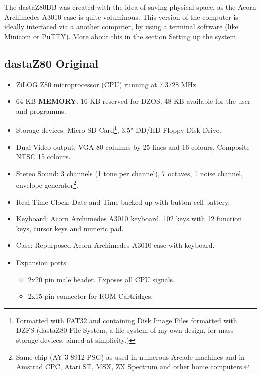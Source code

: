\documentclass[a4paper,11pt]{article}
\begin{document}
    The dastaZ80DB was created with the idea of saving physical space, as the
    Acorn Archimedes A3010 case is quite voluminous. This version of the
    computer is ideally interfaced via a another computer, by using a terminal
    software (like Minicom or PuTTY). More about this in the section
    \hyperref[sec:setting_system]{Setting up the system}.

    \subsection{dastaZ80 Original}

    \begin{itemize}
        \item ZiLOG Z80 microprocessor (CPU) running at 7.3728 MHz
        \item 64 KB \textbf{MEMORY}: 16 KB reserved for DZOS, 48 KB available
            for the user and programms.
        \item Storage devices: Micro SD Card\footnote{Formatted with FAT32 and
            containing Disk Image Files formatted with DZFS (dastaZ80 File
            System, a file system of my own design, for mass storage devices,
            aimed at simplicity.)}, 3.5" DD/HD Floppy Disk Drive.
        \item Dual Video output: VGA 80 columns by 25 lines and 16 colours,
            Composite NTSC 15 colours.
        \item Stereo Sound: 3 channels (1 tone per channel), 7 octaves, 1 noise
            channel, envelope generator\footnote{Same chip (AY-3-8912 PSG) as
            used in numerous Arcade machines and in Amstrad CPC, Atari ST, MSX,
            ZX Spectrum and other home computers.}.
        \item Real-Time Clock: Date and Time backed up with button cell battery.
        \item Keyboard: Acorn Archimedes A3010 keyboard. 102 keys with 12 function
            keys, cursor keys and numeric pad.
        \item Case: Repurposed Acorn Archimedes A3010 case with keyboard.
        \item Expansion ports.
        \begin{itemize}
            \item 2x20 pin male header. Exposes all CPU signals.
            \item 2x15 pin connector for ROM Cartridges.
        \end{itemize}
    \end{itemize}
\end{document}
